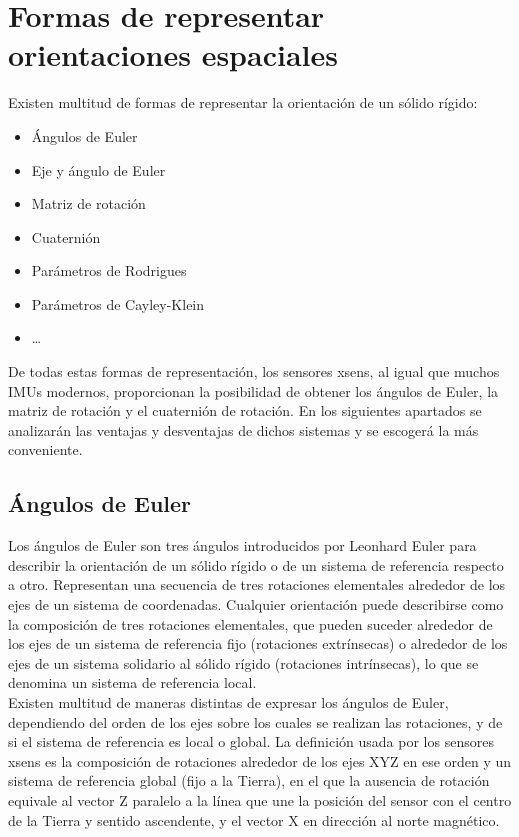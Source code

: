 \documentclass[10pt, a4paper]{report}
\begin{document}
\section{Formas de representar orientaciones espaciales}

Existen multitud de formas de representar la orientación de un sólido rígido:

\begin{itemize}

\item Ángulos de Euler
\item Eje y ángulo de Euler
\item Matriz de rotación
\item Cuaternión
\item Parámetros de Rodrigues
\item Parámetros de Cayley-Klein
\item \ldots

\end{itemize}

De todas estas formas de representación, los sensores xsens, al igual que muchos IMUs modernos, proporcionan la posibilidad de obtener los ángulos de Euler, la matriz de rotación y el cuaternión de rotación. En los siguientes apartados se analizarán las ventajas y desventajas de dichos sistemas y se escogerá la más conveniente.

\subsection{Ángulos de Euler}

Los ángulos de Euler son tres ángulos introducidos por Leonhard Euler para describir la orientación de un sólido rígido o de un sistema de referencia respecto a otro. Representan una secuencia de tres rotaciones elementales alrededor de los ejes de un sistema de coordenadas. Cualquier orientación puede describirse como la composición de tres rotaciones elementales, que pueden suceder alrededor de los ejes de un sistema de referencia fijo (rotaciones extrínsecas) o alrededor de los ejes de un sistema solidario al sólido rígido (rotaciones intrínsecas), lo que se denomina un sistema de referencia local. \\

Existen multitud de maneras distintas de expresar los ángulos de Euler, dependiendo del orden de los ejes sobre los cuales se realizan las rotaciones, y de si el sistema de referencia es local o global. La definición usada por los sensores xsens es la composición de rotaciones alrededor de los ejes XYZ en ese orden y un sistema de referencia global (fijo a la Tierra), en el que la ausencia de rotación equivale al vector Z paralelo a la línea que une la posición del sensor con el centro de la Tierra y sentido ascendente, y el vector X en dirección al norte magnético. \\
\end{document}
